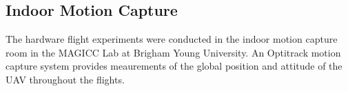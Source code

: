 
\subsection{Indoor Motion Capture}
The hardware flight experiments were conducted in the indoor motion capture room
in the MAGICC Lab at Brigham Young University. An Optitrack motion capture
system provides meaurements of the global position and attitude of the UAV
throughout the flights.

